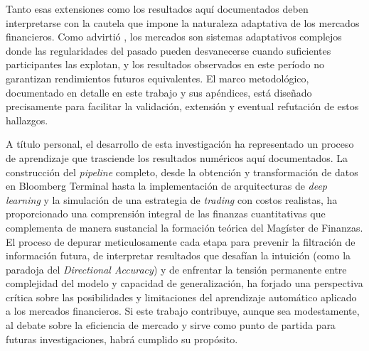 ﻿\documentclass[11pt,a4paper]{article}
\begin{document}
Tanto esas extensiones como los resultados aqu\'i documentados deben interpretarse con la cautela que impone la naturaleza adaptativa de los mercados financieros. Como advirti\'o \citet{lo2019}, los mercados son sistemas adaptativos complejos donde las regularidades del pasado pueden desvanecerse cuando suficientes participantes las explotan, y los resultados observados en este per\'iodo no garantizan rendimientos futuros equivalentes. El marco metodol\'ogico, documentado en detalle en este trabajo y sus ap\'endices, est\'a dise\~nado precisamente para facilitar la validaci\'on, extensi\'on y eventual refutaci\'on de estos hallazgos.

A t\'itulo personal, el desarrollo de esta investigaci\'on ha representado un proceso de aprendizaje que trasciende los resultados num\'ericos aqu\'i documentados. La construcci\'on del \textit{pipeline} completo, desde la obtenci\'on y transformaci\'on de datos en Bloomberg Terminal hasta la implementaci\'on de arquitecturas de \textit{deep learning} y la simulaci\'on de una estrategia de \textit{trading} con costos realistas, ha proporcionado una comprensi\'on integral de las finanzas cuantitativas que complementa de manera sustancial la formaci\'on te\'orica del Mag\'ister de Finanzas. El proceso de depurar meticulosamente cada etapa para prevenir la filtraci\'on de informaci\'on futura, de interpretar resultados que desaf\'ian la intuici\'on (como la paradoja del \textit{Directional Accuracy}) y de enfrentar la tensi\'on permanente entre complejidad del modelo y capacidad de generalizaci\'on, ha forjado una perspectiva cr\'itica sobre las posibilidades y limitaciones del aprendizaje autom\'atico aplicado a los mercados financieros. Si este trabajo contribuye, aunque sea modestamente, al debate sobre la eficiencia de mercado y sirve como punto de partida para futuras investigaciones, habr\'a cumplido su prop\'osito.

\newpage

\end{document}
